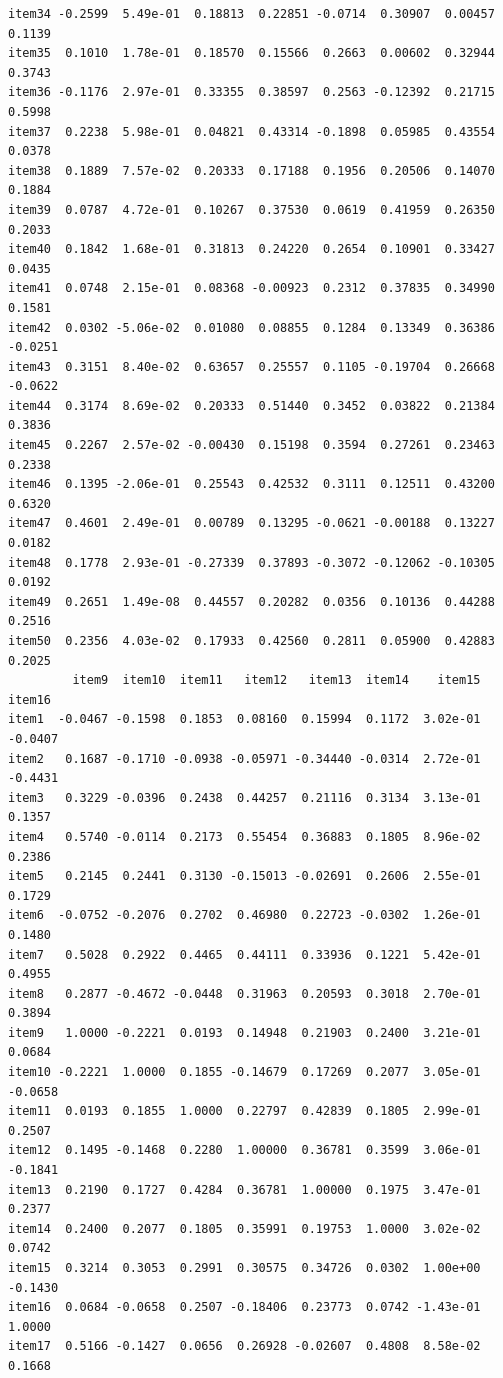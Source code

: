 \documentclass[
  a4paper,
]{ltjsbook}
\begin{document}
\begin{verbatim}
item34 -0.2599  5.49e-01  0.18813  0.22851 -0.0714  0.30907  0.00457  0.1139
item35  0.1010  1.78e-01  0.18570  0.15566  0.2663  0.00602  0.32944  0.3743
item36 -0.1176  2.97e-01  0.33355  0.38597  0.2563 -0.12392  0.21715  0.5998
item37  0.2238  5.98e-01  0.04821  0.43314 -0.1898  0.05985  0.43554  0.0378
item38  0.1889  7.57e-02  0.20333  0.17188  0.1956  0.20506  0.14070  0.1884
item39  0.0787  4.72e-01  0.10267  0.37530  0.0619  0.41959  0.26350  0.2033
item40  0.1842  1.68e-01  0.31813  0.24220  0.2654  0.10901  0.33427  0.0435
item41  0.0748  2.15e-01  0.08368 -0.00923  0.2312  0.37835  0.34990  0.1581
item42  0.0302 -5.06e-02  0.01080  0.08855  0.1284  0.13349  0.36386 -0.0251
item43  0.3151  8.40e-02  0.63657  0.25557  0.1105 -0.19704  0.26668 -0.0622
item44  0.3174  8.69e-02  0.20333  0.51440  0.3452  0.03822  0.21384  0.3836
item45  0.2267  2.57e-02 -0.00430  0.15198  0.3594  0.27261  0.23463  0.2338
item46  0.1395 -2.06e-01  0.25543  0.42532  0.3111  0.12511  0.43200  0.6320
item47  0.4601  2.49e-01  0.00789  0.13295 -0.0621 -0.00188  0.13227  0.0182
item48  0.1778  2.93e-01 -0.27339  0.37893 -0.3072 -0.12062 -0.10305  0.0192
item49  0.2651  1.49e-08  0.44557  0.20282  0.0356  0.10136  0.44288  0.2516
item50  0.2356  4.03e-02  0.17933  0.42560  0.2811  0.05900  0.42883  0.2025
         item9  item10  item11   item12   item13  item14    item15  item16
item1  -0.0467 -0.1598  0.1853  0.08160  0.15994  0.1172  3.02e-01 -0.0407
item2   0.1687 -0.1710 -0.0938 -0.05971 -0.34440 -0.0314  2.72e-01 -0.4431
item3   0.3229 -0.0396  0.2438  0.44257  0.21116  0.3134  3.13e-01  0.1357
item4   0.5740 -0.0114  0.2173  0.55454  0.36883  0.1805  8.96e-02  0.2386
item5   0.2145  0.2441  0.3130 -0.15013 -0.02691  0.2606  2.55e-01  0.1729
item6  -0.0752 -0.2076  0.2702  0.46980  0.22723 -0.0302  1.26e-01  0.1480
item7   0.5028  0.2922  0.4465  0.44111  0.33936  0.1221  5.42e-01  0.4955
item8   0.2877 -0.4672 -0.0448  0.31963  0.20593  0.3018  2.70e-01  0.3894
item9   1.0000 -0.2221  0.0193  0.14948  0.21903  0.2400  3.21e-01  0.0684
item10 -0.2221  1.0000  0.1855 -0.14679  0.17269  0.2077  3.05e-01 -0.0658
item11  0.0193  0.1855  1.0000  0.22797  0.42839  0.1805  2.99e-01  0.2507
item12  0.1495 -0.1468  0.2280  1.00000  0.36781  0.3599  3.06e-01 -0.1841
item13  0.2190  0.1727  0.4284  0.36781  1.00000  0.1975  3.47e-01  0.2377
item14  0.2400  0.2077  0.1805  0.35991  0.19753  1.0000  3.02e-02  0.0742
item15  0.3214  0.3053  0.2991  0.30575  0.34726  0.0302  1.00e+00 -0.1430
item16  0.0684 -0.0658  0.2507 -0.18406  0.23773  0.0742 -1.43e-01  1.0000
item17  0.5166 -0.1427  0.0656  0.26928 -0.02607  0.4808  8.58e-02  0.1668

\end{verbatim}
\end{document}
